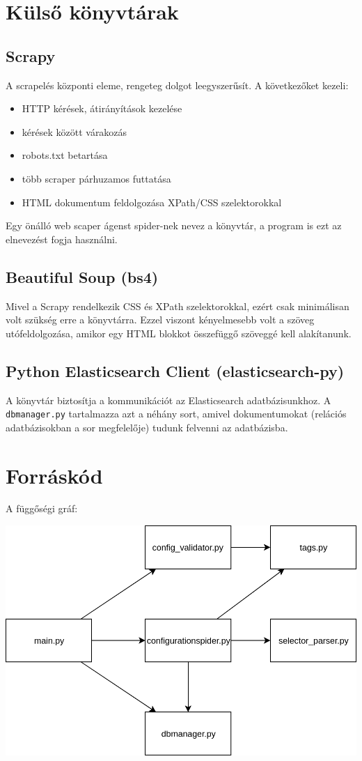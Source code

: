 \documentclass[10pt]{article}
\begin{document}
\section{Külső könyvtárak}

\subsection{Scrapy}
A scrapelés központi eleme, rengeteg dolgot leegyszerűsít. \cite{scrapy_glance}
A következőket kezeli:
\begin{itemize}
  \item HTTP kérések, átirányítások kezelése
  \item kérések között várakozás
  \item robots.txt betartása
  \item több scraper párhuzamos futtatása
  \item HTML dokumentum feldolgozása XPath/CSS szelektorokkal 
\end{itemize}
Egy önálló web scaper ágenst spider-nek nevez a könyvtár, a program is ezt az elnevezést fogja használni.


\subsection{Beautiful Soup (bs4)}
Mivel a Scrapy rendelkezik CSS és XPath szelektorokkal, ezért csak minimálisan volt szükség erre a könyvtárra. Ezzel viszont kényelmesebb volt a szöveg utófeldolgozása, amikor egy HTML blokkot összefüggő szöveggé kell alakítanunk.

\subsection{Python Elasticsearch Client (elasticsearch-py)}
A könyvtár biztosítja a kommunikációt az Elasticsearch adatbázisunkhoz. A \lstinline{dbmanager.py} tartalmazza azt a néhány sort, amivel dokumentumokat (relációs adatbázisokban a sor megfelelője) tudunk felvenni az adatbázisba.

\section{Forráskód}

A függőségi gráf:
\begin{center}
    \includegraphics[scale=0.33]{scraper_arch.png}
\end{center}
\end{document}
